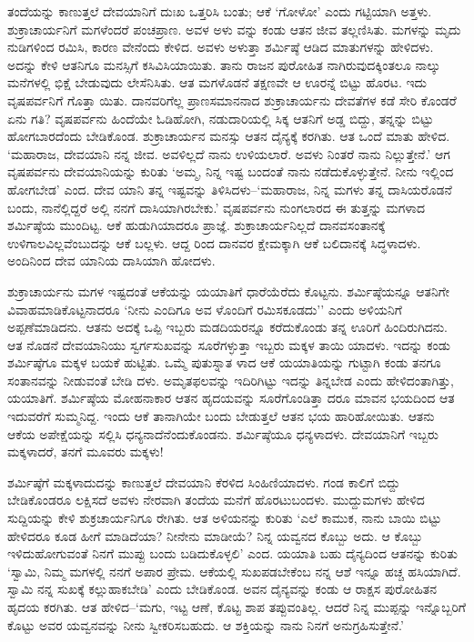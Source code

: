 ತಂದೆಯನ್ನು ಕಾಣುತ್ತಲೆ ದೇವಯಾನಿಗೆ ದುಃಖ ಒತ್ತರಿಸಿ ಬಂತು; ಆಕೆ ‘ಗೋಳೋ’ ಎಂದು ಗಟ್ಟಿಯಾಗಿ ಅತ್ತಳು. ಶುಕ್ರಾಚಾರ್ಯನಿಗೆ ಮಗಳೆಂದರೆ ಪಂಚಪ್ರಾಣ. ಅವಳ ಅಳು ವನ್ನು ಕಂಡು ಆತನ ಜೀವ ತಲ್ಲಣಿಸಿತು. ಮಗಳನ್ನು ಮೃದು ನುಡಿಗಳಿಂದ ರಮಿಸಿ, ಕಾರಣ ವೇನೆಂದು ಕೇಳಿದ. ಅವಳು ಅಳುತ್ತಾ ಶರ್ಮಿಷ್ಠೆ ಆಡಿದ ಮಾತುಗಳನ್ನು ಹೇಳಿದಳು. ಅದನ್ನು ಕೇಳಿ ಆತನಿಗೂ ಮನಸ್ಸಿಗೆ ಕಸಿವಿಸಿಯಾಯಿತು. ತಾನು ರಾಜನ ಪುರೋಹಿತ ನಾಗಿರುವುದಕ್ಕಿಂತಲೂ ನಾಲ್ಕು ಮನೆಗಳಲ್ಲಿ ಭಿಕ್ಷೆ ಬೇಡುವುದು ಲೇಸೆನಿಸಿತು. ಆತ ಮಗಳೊಡನೆ ತಕ್ಷಣವೇ ಆ ಊರನ್ನೆ ಬಿಟ್ಟು ಹೊರಟ. ಇದು ವೃಷಪರ್ವನಿಗೆ ಗೊತ್ತಾ ಯಿತು. ದಾನವರಿಗೆಲ್ಲ ಪ್ರಾಣಸಮಾನನಾದ ಶುಕ್ರಾಚಾರ್ಯನು ದೇವತೆಗಳ ಕಡೆ ಸೇರಿ ಕೊಂಡರೆ ಏನು ಗತಿ? ವೃಷಪರ್ವನು ಹಿಂದೆಯೇ ಓಡಿಹೋಗಿ, ನಡುದಾರಿಯಲ್ಲಿ ಸಿಕ್ಕ ಆತನಿಗೆ ಅಡ್ಡ ಬಿದ್ದು, ತನ್ನನ್ನು ಬಿಟ್ಟು ಹೋಗಬಾರದೆಂದು ಬೇಡಿಕೊಂಡ. ಶುಕ್ರಾಚಾರ್ಯನ ಮನಸ್ಸು ಆತನ ದೈನ್ಯಕ್ಕೆ ಕರಗಿತು. ಆತ ಒಂದೆ ಮಾತು ಹೇಳಿದ. ‘ಮಹಾರಾಜ, ದೇವಯಾನಿ ನನ್ನ ಜೀವ. ಅವಳಿಲ್ಲದೆ ನಾನು ಉಳಿಯಲಾರೆ. ಅವಳು ನಿಂತರೆ ನಾನು ನಿಲ್ಲುತ್ತೇನೆ.’ ಆಗ ವೃಷಪರ್ವನು ದೇವಯಾನಿಯನ್ನು ಕುರಿತು ‘ಅಮ್ಮ, ನಿನ್ನ ಇಷ್ಟ ಬಂದಂತೆ ನಾನು ನಡೆದುಕೊಳ್ಳುತ್ತೇನೆ. ನೀನು ಇಲ್ಲಿಂದ ಹೋಗಬೇಡ’ ಎಂದ. ದೇವ ಯಾನಿ ತನ್ನ ಇಷ್ಟವನ್ನು ತಿಳಿಸಿದಳು–‘ಮಹಾರಾಜ, ನಿನ್ನ ಮಗಳು ತನ್ನ ದಾಸಿಯರೊಡನೆ ಬಂದು, ನಾನೆಲ್ಲಿದ್ದರೆ ಅಲ್ಲಿ ನನಗೆ ದಾಸಿಯಾಗಿರಬೇಕು.’ ವೃಷಪರ್ವನು ನುಂಗಲಾರದ ಈ ತುತ್ತನ್ನು ಮಗಳಾದ ಶರ್ಮಿಷ್ಠೆಯ ಮುಂದಿಟ್ಟ. ಆಕೆ ಹುಡುಗಿಯಾದರೂ ಪ್ರಾಜ್ಞೆ. ಶುಕ್ರಾಚಾರ್ಯನಿಲ್ಲದೆ ದಾನವಸಂತಾನಕ್ಕೆ ಉಳಿಗಾಲವಿಲ್ಲವೆಂಬುದನ್ನು ಆಕೆ ಬಲ್ಲಳು. ಆದ್ದ ರಿಂದ ದಾನವರ ಕ್ಷೇಮಕ್ಕಾಗಿ ಆಕೆ ಬಲಿದಾನಕ್ಕೆ ಸಿದ್ಧಳಾದಳು. ಅಂದಿನಿಂದ ದೇವ ಯಾನಿಯ ದಾಸಿಯಾಗಿ ಹೋದಳು.

ಶುಕ್ರಾಚಾರ್ಯನು ಮಗಳ ಇಷ್ಟದಂತೆ ಆಕೆಯನ್ನು ಯಯಾತಿಗೆ ಧಾರೆಯೆರೆದು ಕೊಟ್ಟನು. ಶರ್ಮಿಷ್ಠೆಯನ್ನೂ ಆತನಿಗೇ ವಿವಾಹಮಾಡಿಕೊಟ್ಟನಾದರೂ ‘ನೀನು ಎಂದಿಗೂ ಅವ ಳೊಂದಿಗೆ ರಮಿಸಕೂಡದು’’ ಎಂದು ಅಳಿಯನಿಗೆ ಅಪ್ಪಣೆಮಾಡಿದನು. ಆತನು ಅದಕ್ಕೆ ಒಪ್ಪಿ ಇಬ್ಬರು ಮಡದಿಯರನ್ನೂ ಕರೆದುಕೊಂಡು ತನ್ನ ಊರಿಗೆ ಹಿಂದಿರುಗಿದನು. ಆತ ನೊಡನೆ ದೇವಯಾನಿಯು ಸ್ವರ್ಗಸುಖವನ್ನು ಸೂರೆಗಳ್ಳುತ್ತಾ ಇಬ್ಬರು ಮಕ್ಕಳ ತಾಯಿ ಯಾದಳು. ಇದನ್ನು ಕಂಡು ಶರ್ಮಿಷ್ಠೆಗೂ ಮಕ್ಕಳ ಬಯಕೆ ಹುಟ್ಟಿತು. ಒಮ್ಮೆ ಪುತುಸ್ನಾತ ಳಾದ ಆಕೆ ಯಯಾತಿಯನ್ನು ಗುಟ್ಟಾಗಿ ಕಂಡು ತನಗೂ ಸಂತಾನವನ್ನು ನೀಡುವಂತೆ ಬೇಡಿ ದಳು. ಅಮೃತಫಲವನ್ನು ಇದಿರಿಗಿಟ್ಟು ಇದನ್ನು ತಿನ್ನಬೇಡ ಎಂದು ಹೇಳಿದಂತಾಗಿತ್ತು, ಯಯಾತಿಗೆ. ಶರ್ಮಿಷ್ಠೆಯ ಮೋಹನಾಕಾರ ಆತನ ಹೃದಯವನ್ನು ಸೂರೆಗೊಂಡಿತ್ತಾ ದರೂ ಮಾವನ ಭಯದಿಂದ ಆತ ಇದುವರೆಗೆ ಸುಮ್ಮನಿದ್ದ. ಇಂದು ಆಕೆ ತಾನಾಗಿಯೇ ಬಂದು ಬೇಡುತ್ತಲೆ ಆತನ ಭಯ ಹಾರಿಹೋಯಿತು. ಆತನು ಆಕೆಯ ಅಪೇಕ್ಷೆಯನ್ನು ಸಲ್ಲಿಸಿ ಧನ್ಯನಾದೆನೆಂದುಕೊಂಡನು. ಶರ್ಮಿಷ್ಠೆಯೂ ಧನ್ಯಳಾದಳು. ದೇವಯಾನಿಗೆ ಇಬ್ಬರು ಮಕ್ಕಳಾದರೆ, ತನಗೆ ಮೂವರು ಮಕ್ಕಳು!

ಶರ್ಮಿಷ್ಠೆಗೆ ಮಕ್ಕಳಾದುದನ್ನು ಕಾಣುತ್ತಲೆ ದೇವಯಾನಿ ಕೆರಳಿದ ಸಿಂಹಿಣಿಯಾದಳು. ಗಂಡ ಕಾಲಿಗೆ ಬಿದ್ದು ಬೇಡಿಕೊಂಡರೂ ಲಕ್ಷಿಸದೆ ಅವಳು ನೇರವಾಗಿ ತಂದೆಯ ಮನೆಗೆ ಹೊರಟುಬಂದಳು. ಮುದ್ದುಮಗಳು ಹೇಳಿದ ಸುದ್ದಿಯನ್ನು ಕೇಳಿ ಶುಕ್ರಚಾರ್ಯನಿಗೂ ರೇಗಿತು. ಆತ ಅಳಿಯನನ್ನು ಕುರಿತು ‘ಎಲೆ ಕಾಮುಕ, ನಾನು ಬಾಯಿ ಬಿಟ್ಟು ಹೇಳಿದರೂ ಕೂಡ ಹೀಗೆ ಮಾಡಿದೆಯಾ? ನೀನೇನು ಮಾಡೀಯೆ? ನಿನ್ನ ಯವ್ವನದ ಕೊಬ್ಬು ಅದು. ಆ ಕೊಬ್ಬು ಇಳಿದುಹೋಗುವಂತೆ ನಿನಗೆ ಮುಪ್ಪು ಬಂದು ಬಡಿದುಕೊಳ್ಳಲಿ’ ಎಂದ. ಯಯಾತಿ ಬಹು ದೈನ್ಯದಿಂದ ಆತನನ್ನು ಕುರಿತು ‘ಸ್ವಾಮಿ, ನಿಮ್ಮ ಮಗಳಲ್ಲಿ ನನಗೆ ಅಪಾರ ಪ್ರೇಮ. ಆಕೆಯಲ್ಲಿ ಸುಖಪಡಬೇಕೆಂಬ ನನ್ನ ಆಶೆ ಇನ್ನೂ ಹಚ್ಚ ಹಸಿಯಾಗಿದೆ. ಸ್ವಾಮಿ ನನ್ನ ಸುಖಕ್ಕೆ ಕಲ್ಲುಹಾಕಬೇಡಿ’ ಎಂದು ಬೇಡಿಕೊಂಡ. ಅವನ ದೈನ್ಯವನ್ನು ಕಂಡು ಆ ರಾಕ್ಷಸ ಪುರೋಹಿತನ ಹೃದಯ ಕರಗಿತು. ಆತ ಹೇಳಿದ–‘ಮಗು, ಇಟ್ಟ ಆಣೆ, ಕೊಟ್ಟ ಶಾಪ ತಪ್ಪುವಂತಿಲ್ಲ. ಆದರೆ ನಿನ್ನ ಮುಪ್ಪನ್ನು ಇನ್ನೊಬ್ಬರಿಗೆ ಕೊಟ್ಟು ಅವರ ಯವ್ವನವನ್ನು ನೀನು ಸ್ವೀಕರಿಸಬಹುದು. ಆ ಶಕ್ತಿಯನ್ನು ನಾನು ನಿನಗೆ ಅನುಗ್ರಹಿಸುತ್ತೇನೆ.’

